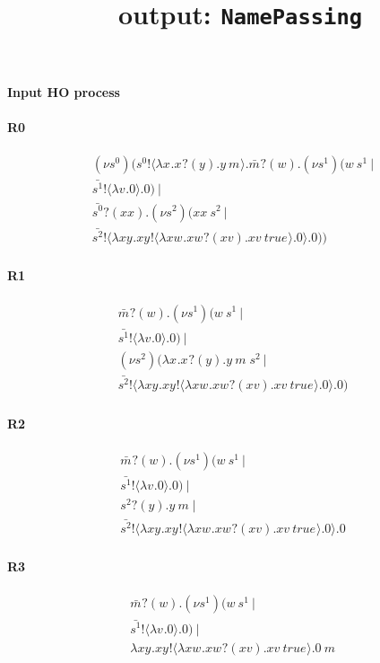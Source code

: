 \documentclass{article}
\title{\misty \ output: \texttt{NamePassing}}
\begin{document}
\maketitle
\paragraph{Input HO process}

\paragraph{R0}
\begin{align*}
(\nu s^{0}_{})(s^{0}_{}! \langle  \lambda x_{}.x_{}?(y).y \ m_{} \rangle.\bar{m_{}}?(w).(\nu s^{1}_{})(w \ s^{1}_{} \ | \\ \bar{s^{1}_{}}! \langle  \lambda v_{}.0  \rangle.0 )  \ | \\ \bar{s^{0}_{}}?(xx).(\nu s^{2}_{})(xx \ s^{2}_{} \ | \\ \bar{s^{2}_{}}! \langle  \lambda xy_{}.xy_{}! \langle  \lambda xw_{}.xw_{}?(xv).xv \ true_{} \rangle.0  \rangle.0 ) ) 
\end{align*}
\paragraph{R1}
\begin{align*}
\bar{m_{}}?(w).(\nu s^{1}_{})(w \ s^{1}_{} \ | \\ \bar{s^{1}_{}}! \langle  \lambda v_{}.0  \rangle.0 )  \ | \\ (\nu s^{2}_{})(\lambda x_{}.x_{}?(y).y \ m_{} \ s^{2}_{} \ | \\ \bar{s^{2}_{}}! \langle  \lambda xy_{}.xy_{}! \langle  \lambda xw_{}.xw_{}?(xv).xv \ true_{} \rangle.0  \rangle.0 ) 
\end{align*}
\paragraph{R2}
\begin{align*}
\bar{m_{}}?(w).(\nu s^{1}_{})(w \ s^{1}_{} \ | \\ \bar{s^{1}_{}}! \langle  \lambda v_{}.0  \rangle.0 )  \ | \\ s^{2}_{}?(y).y \ m_{} \ | \\ \bar{s^{2}_{}}! \langle  \lambda xy_{}.xy_{}! \langle  \lambda xw_{}.xw_{}?(xv).xv \ true_{} \rangle.0  \rangle.0 
\end{align*}
\paragraph{R3}
\begin{align*}
\bar{m_{}}?(w).(\nu s^{1}_{})(w \ s^{1}_{} \ | \\ \bar{s^{1}_{}}! \langle  \lambda v_{}.0  \rangle.0 )  \ | \\ \lambda xy_{}.xy_{}! \langle  \lambda xw_{}.xw_{}?(xv).xv \ true_{} \rangle.0  \ m_{}
\end{align*}
\end{document}
